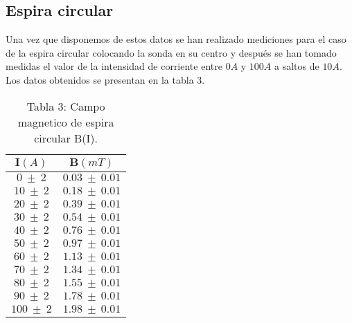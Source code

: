 \documentclass[article, 11pt]{report}
\begin{document}
\subsection{Espira circular}

Una vez que disponemos de estos datos se han realizado mediciones para el caso de la espira circular colocando la sonda en su  centro y después se han tomado medidas el valor de la intensidad de corriente entre $0A$ y $100A$ a saltos de $10A$. Los datos obtenidos se presentan en la tabla 3.



\begin{table}[H]
	\begin{center}
		\begin{tabular}{| c | c  |  }
			\hline 
			$\mathbf{I} (A)$ & $\mathbf{B}(mT)$  \\
			\hline
			
			
			$0~ \pm ~ 2$ & $ 0.03 ~ \pm ~ 0.01$  \\
			
			$10 ~ \pm ~ 2$ & $0.18~ \pm ~ 0.01$   \\
			
			$20~ \pm ~ 2$ & $0.39 ~ \pm ~ 0.01$  \\
			
			$30 ~ \pm ~ 2$ & $0.54 ~ \pm ~ 0.01$   \\
			
			$40 ~ \pm ~ 2$ & $0.76 ~ \pm ~ 0.01$   \\
			
			$50 ~ \pm ~ 2$ & $0.97 ~ \pm ~ 0.01$ \\
			
			$60 ~ \pm ~ 2$ & $1.13 ~ \pm ~ 0.01$   \\
			
			$70 ~ \pm ~ 2$ & $1.34 ~ \pm ~ 0.01$   \\
			
			$80 ~ \pm ~ 2$ & $1.55 ~ \pm ~ 0.01$   \\
			
			$90 ~ \pm ~ 2$ & $1.78 ~ \pm ~ 0.01$  \\
				
			$100 ~ \pm ~ 2$ & $1.98 ~ \pm ~ 0.01$  \\
			
			\hline
			
		\end{tabular}
		\label{Tab:3}
		\caption*{Tabla 3: Campo magnetico de espira circular B(I).}
	\end{center}
\end{table}
\end{document}
